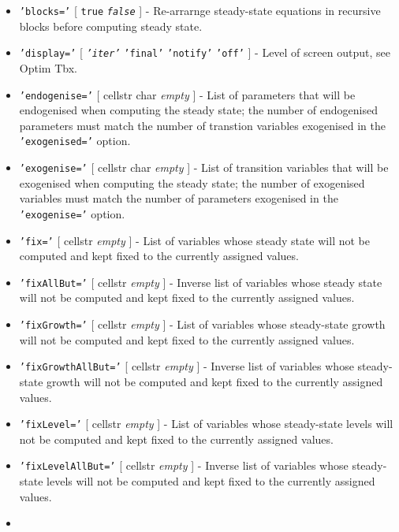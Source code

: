 \begin{itemize}
\item
  \texttt{'blocks='} {[} \texttt{true} \textbar{} \emph{\texttt{false}}
  {]} - Re-arrarnge steady-state equations in recursive blocks before
  computing steady state.
\item
  \texttt{'display='} {[} \emph{\texttt{'iter'}} \textbar{}
  \texttt{'final'} \textbar{} \texttt{'notify'} \textbar{}
  \texttt{'off'} {]} - Level of screen output, see Optim Tbx.
\item
  \texttt{'endogenise='} {[} cellstr \textbar{} char \textbar{}
  \emph{empty} {]} - List of parameters that will be endogenised when
  computing the steady state; the number of endogenised parameters must
  match the number of transtion variables exogenised in the
  \texttt{'exogenised='} option.
\item
  \texttt{'exogenise='} {[} cellstr \textbar{} char \textbar{}
  \emph{empty} {]} - List of transition variables that will be
  exogenised when computing the steady state; the number of exogenised
  variables must match the number of parameters exogenised in the
  \texttt{'exogenise='} option.
\item
  \texttt{'fix='} {[} cellstr \textbar{} \emph{empty} {]} - List of
  variables whose steady state will not be computed and kept fixed to
  the currently assigned values.
\item
  \texttt{'fixAllBut='} {[} cellstr \textbar{} \emph{empty} {]} -
  Inverse list of variables whose steady state will not be computed and
  kept fixed to the currently assigned values.
\item
  \texttt{'fixGrowth='} {[} cellstr \textbar{} \emph{empty} {]} - List
  of variables whose steady-state growth will not be computed and kept
  fixed to the currently assigned values.
\item
  \texttt{'fixGrowthAllBut='} {[} cellstr \textbar{} \emph{empty} {]} -
  Inverse list of variables whose steady-state growth will not be
  computed and kept fixed to the currently assigned values.
\item
  \texttt{'fixLevel='} {[} cellstr \textbar{} \emph{empty} {]} - List of
  variables whose steady-state levels will not be computed and kept
  fixed to the currently assigned values.
\item
  \texttt{'fixLevelAllBut='} {[} cellstr \textbar{} \emph{empty} {]} -
  Inverse list of variables whose steady-state levels will not be
  computed and kept fixed to the currently assigned values.
\item

\end{itemize}
